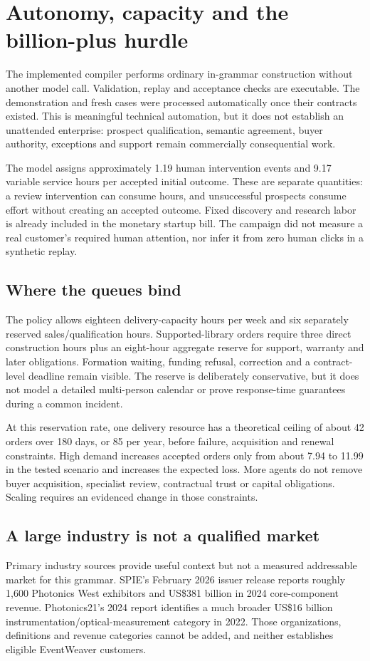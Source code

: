 \section{Autonomy, capacity and the billion-plus hurdle}
The implemented compiler performs ordinary in-grammar construction without another model call. Validation, replay and acceptance checks are executable. The demonstration and fresh cases were processed automatically once their contracts existed. This is meaningful technical automation, but it does not establish an unattended enterprise: prospect qualification, semantic agreement, buyer authority, exceptions and support remain commercially consequential work.

The model assigns approximately 1.19 human intervention events and 9.17 variable service hours per accepted initial outcome. These are separate quantities: a review intervention can consume hours, and unsuccessful prospects consume effort without creating an accepted outcome. Fixed discovery and research labor is already included in the monetary startup bill. The campaign did not measure a real customer's required human attention, nor infer it from zero human clicks in a synthetic replay.

\subsection{Where the queues bind}
The policy allows eighteen delivery-capacity hours per week and six separately reserved sales/qualification hours. Supported-library orders require three direct construction hours plus an eight-hour aggregate reserve for support, warranty and later obligations. Formation waiting, funding refusal, correction and a contract-level deadline remain visible. The reserve is deliberately conservative, but it does not model a detailed multi-person calendar or prove response-time guarantees during a common incident.

At this reservation rate, one delivery resource has a theoretical ceiling of about 42 orders over 180 days, or 85 per year, before failure, acquisition and renewal constraints. High demand increases accepted orders only from about 7.94 to 11.99 in the tested scenario and increases the expected loss. More agents do not remove buyer acquisition, specialist review, contractual trust or capital obligations. Scaling requires an evidenced change in those constraints.

\subsection{A large industry is not a qualified market}
Primary industry sources provide useful context but not a measured addressable market for this grammar. SPIE's February 2026 issuer release reports roughly 1,600 Photonics West exhibitors and US\$381 billion in 2024 core-component revenue. Photonics21's 2024 report identifies a much broader US\$16 billion instrumentation/optical-measurement category in 2022. Those organizations, definitions and revenue categories cannot be added, and neither establishes eligible EventWeaver customers.\cite{spie,photonics21}

